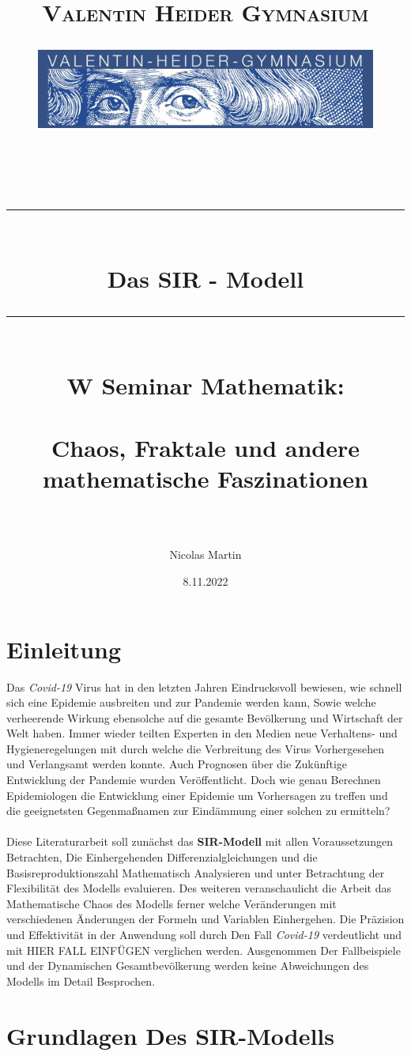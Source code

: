 \documentclass[12pt]{scrartcl} %
\title{	
	\normalfont\normalsize
	\vspace{200pt}
	\textsc{Valentin Heider Gymnasium}\\
	\begin{figure}[h] %
	\centering
	\includegraphics[width=0.5\columnwidth]{VHGLogo.jpg} 
	\end{figure}
	\vspace{25pt}\\
	
	\rule{\linewidth}{0.5pt}\\
	\vspace{20pt}
	{\huge Das SIR - Modell}\\
	\vspace{12pt}
	\rule{\linewidth}{2pt}\\
	\vspace{20pt}
	{\Large W Seminar Mathematik:}\\
	\vspace{12pt}\\
	{\Large Chaos, Fraktale und andere mathematische Faszinationen}\\
	\vspace{15pt}\\
}
\author{\LARGE Nicolas Martin} %
\date{\normalsize 8.11.2022}
\begin{document}

\maketitle %
\newpage

\doublespacing
\tableofcontents
\onehalfspacing
\newpage


\section{Einleitung}

Das \textsl{Covid-19} Virus hat in den letzten Jahren Eindrucksvoll bewiesen, wie schnell sich eine Epidemie ausbreiten und zur Pandemie werden kann,  
Sowie welche verheerende Wirkung ebensolche auf die gesamte Bevölkerung und Wirtschaft der Welt haben. 
Immer wieder teilten Experten in den Medien neue Verhaltens- und Hygieneregelungen mit durch welche die Verbreitung des Virus Vorhergesehen und Verlangsamt werden konnte. Auch Prognosen über die Zukünftige Entwicklung der Pandemie wurden Veröffentlicht. 
Doch wie genau Berechnen Epidemiologen die Entwicklung einer Epidemie um Vorhersagen zu treffen und die geeignetsten Gegenmaßnamen zur Eindämmung einer solchen zu ermitteln?\\
\\
Diese Literaturarbeit soll zunächst das \textbf{SIR-Modell} mit allen Voraussetzungen Betrachten, Die Einhergehenden Differenzialgleichungen und die Basisreproduktionszahl Mathematisch Analysieren und unter Betrachtung der Flexibilität des Modells evaluieren. 
Des weiteren veranschaulicht die Arbeit das Mathematische Chaos des Modells 
ferner welche Veränderungen mit verschiedenen Änderungen der Formeln und Variablen Einhergehen. 
Die Präzision und Effektivität in der Anwendung soll durch Den Fall \textsl{Covid-19} verdeutlicht und mit  HIER FALL EINFÜGEN verglichen werden. 
Ausgenommen Der Fallbeispiele und der Dynamischen Gesamtbevölkerung werden keine Abweichungen des Modells im Detail Besprochen. 


\newpage
\section{Grundlagen Des SIR-Modells}
\end{document}
